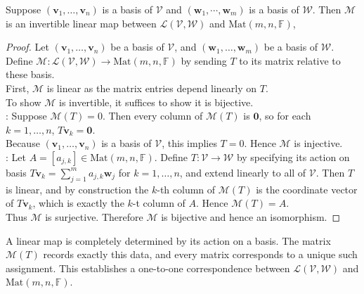 \begin{theorem} \label{thm:invertiblelinmap} Suppose $(\mathbf{v}_1, \ldots, \mathbf{v}_n)$ is a basis of $\mathcal{V}$ and $(\mathbf{w}_1, \cdots, \mathbf{w}_m)$ is a basis of $\mathcal{W}$. Then $\mathcal{M}$ is an invertible linear map between $\mathcal{L}(\mathcal{V}, \mathcal{W}) $ and $\text{Mat}(m,n,\mathbb{F})$,
\begin{proof} Let $(\mathbf{v}_1, \ldots, \mathbf{v}_n)$ be a basis of $\mathcal{V}$, and $(\mathbf{w}_1, \ldots, \mathbf{w}_m)$ be a basis of $\mathcal{W}$. Define $\mathcal{M}: \mathcal{L}(\mathcal{V}, \mathcal{W}) \rightarrow \text{Mat}(m, n, \mathbb{F})$ by sending $T$ to its matrix relative to these basis.\\
First, $\mathcal{M}$ is linear as the matrix entries depend linearly on $T$.\\
To show $\mathcal{M}$ is invertible, it suffices to show it is bijective.\\
: Suppose $\mathcal{M}(T) = 0$. Then every column of $\mathcal{M}(T)$ is $\mathbf{0}$, so for each $k = 1, \ldots, n$, $T \mathbf{v}_k = \mathbf{0}$.\\
Because $(\mathbf{v}_1, \ldots, \mathbf{v}_n)$ is a basis of $\mathcal{V}$, this implies $T = 0$. Hence $\mathcal{M}$ is injective.\\
: Let $A = [a_{j,k}] \in \text{Mat}(m,n,\mathbb{F})$. Define $T: \mathcal{V} \rightarrow \mathcal{W}$ by specifying its action on basis $T \mathbf{v}_k = \sum\limits_{j=1}^m a_{j,k} \mathbf{w}_j$ for $k = 1, \ldots, n$, and extend linearly to all of $\mathcal{V}$. Then $T$ is linear, and by construction the $k$-th column of $\mathcal{M}(T)$ is the coordinate vector of $T \mathbf{v}_k$, which is exactly the $k$-t column of $A$. Hence $\mathcal{M}(T) = A$.\\
Thus $\mathcal{M}$ is surjective. Therefore $\mathcal{M}$ is bijective and hence an isomorphism.
\end{proof}
\end{theorem}

A linear map is completely determined by its action on a basis. The matrix $\mathcal{M}(T)$ records exactly this data, and every matrix corresponds to a unique such assignment. This establishes a one-to-one correspondence between $\mathcal{L}(\mathcal{V}, \mathcal{W})$ and $\text{Mat}(m,n,\mathbb{F})$.


